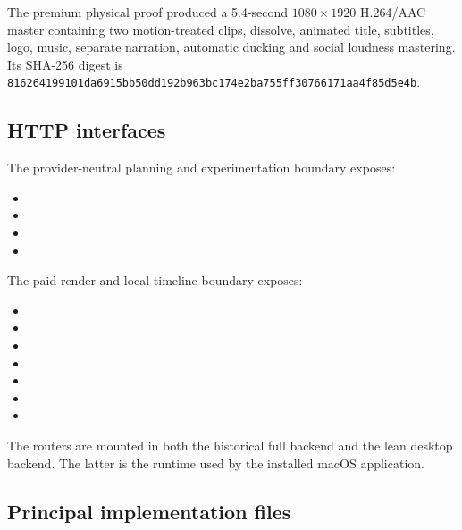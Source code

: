 The premium physical proof produced a 5.4-second $1080\times1920$ H.264/AAC
master containing two motion-treated clips, dissolve, animated title, subtitles,
logo, music, separate narration, automatic ducking and social loudness
mastering. Its SHA-256 digest is
\texttt{816264199101da6915bb50dd192b963bc174e2ba755ff30766171aa4f85d5e4b}.

\subsection{HTTP interfaces}

The provider-neutral planning and experimentation boundary exposes:

\begin{itemize}
    \item {}
    \item {}
    \item {}
    \item {}
\end{itemize}

The paid-render and local-timeline boundary exposes:

\begin{itemize}
    \item {}
    \item {}
    \item {}
    \item {}
    \item {}
    \item {}
    \item {}
\end{itemize}

The routers are mounted in both the historical full backend and the lean desktop
backend. The latter is the runtime used by the installed macOS application.

\subsection{Principal implementation files}

